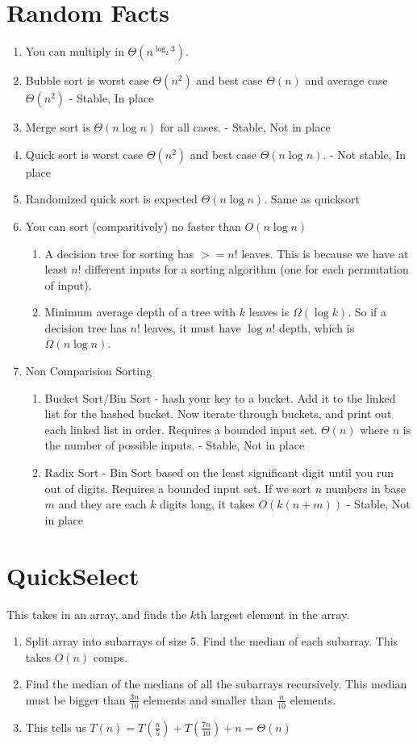 \documentclass[12pt,twocolumn]{article}
\begin{document}
\section{Random Facts}
\begin{enumerate}
    \item You can multiply in $\Theta(n^{\log_2 3})$.
    \item Bubble sort is worst case $\Theta(n^2)$ and best case $\Theta(n)$ and average case $\Theta(n^2)$ - Stable, In place
    \item Merge sort is $\Theta(n \log n)$ for all cases. - Stable, Not in place
    \item Quick sort is worst case $\Theta(n^2)$ and best case $\Theta(n \log n)$. - Not stable, In place
    \item Randomized quick sort is expected $\Theta(n \log n)$. Same as quicksort
    \item You can sort (comparitively) no faster than $O(n \log n)$
        \begin{enumerate}
            \item A decision tree for sorting has $>= n!$ leaves. This is because we have at least $n!$ different inputs for a sorting algorithm (one for each permutation of input).
            \item Minimum average depth of a tree with $k$ leaves is $\Omega(\log k)$. So if a decision tree has $n!$ leaves, it must have $\log n!$ depth, which is $\Omega(n \log n)$.
        \end{enumerate}
    \item Non Comparision Sorting
        \begin{enumerate}
            \item Bucket Sort/Bin Sort - hash your key to a bucket. Add it to the linked list for the hashed bucket. Now iterate through buckets, and print out each linked list in order. Requires a bounded input set. $\Theta(n)$ where $n$ is the number of possible inputs. - Stable, Not in place
            \item Radix Sort - Bin Sort based on the least significant digit until you run out of digits. Requires a bounded input set. If we sort $n$ numbers in base $m$ and they are each $k$ digits long, it takes $O(k(n + m))$ - Stable, Not in place
        \end{enumerate}
\end{enumerate}

\section{QuickSelect}
This takes in an array, and finds the $k$th largest element in the array.
\begin{enumerate}
    \item Split array into subarrays of size 5. Find the median of each subarray. This takes $O(n)$ comps.
    \item Find the median of the medians of all the subarrays recursively. This median must be bigger than $\frac{3n}{10}$ elements and smaller than $\frac{n}{10}$ elements.
    \item This tells us $T(n) = T(\frac{n}{5}) + T(\frac{7n}{10}) + n = \Theta(n)$
\end{enumerate}
\end{document}
